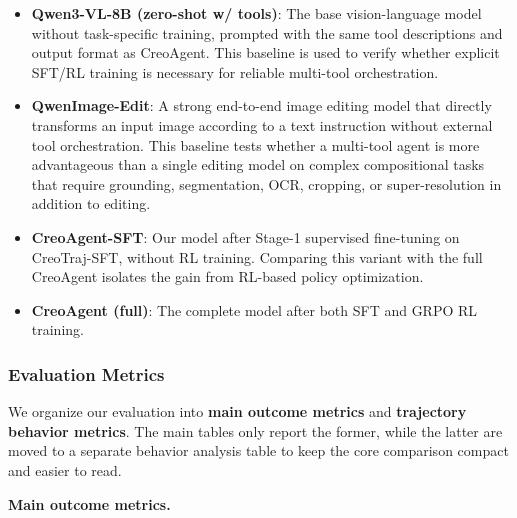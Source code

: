 \documentclass[11pt]{article}
\begin{document}
\begin{itemize}
    \item \textbf{Qwen3-VL-8B (zero-shot w/ tools)}: The base vision-language model without task-specific training, prompted with the same tool descriptions and output format as CreoAgent. This baseline is used to verify whether explicit SFT/RL training is necessary for reliable multi-tool orchestration.
    \item \textbf{QwenImage-Edit}: A strong end-to-end image editing model that directly transforms an input image according to a text instruction without external tool orchestration. This baseline tests whether a multi-tool agent is more advantageous than a single editing model on complex compositional tasks that require grounding, segmentation, OCR, cropping, or super-resolution in addition to editing.
    \item \textbf{CreoAgent-SFT}: Our model after Stage-1 supervised fine-tuning on CreoTraj-SFT, without RL training. Comparing this variant with the full CreoAgent isolates the gain from RL-based policy optimization.
    \item \textbf{CreoAgent (full)}: The complete model after both SFT and GRPO RL training.
\end{itemize}

\subsubsection{Evaluation Metrics}

We organize our evaluation into \textbf{main outcome metrics} and \textbf{trajectory behavior metrics}. The main tables only report the former, while the latter are moved to a separate behavior analysis table to keep the core comparison compact and easier to read.

\textbf{Main outcome metrics.}
\end{document}
